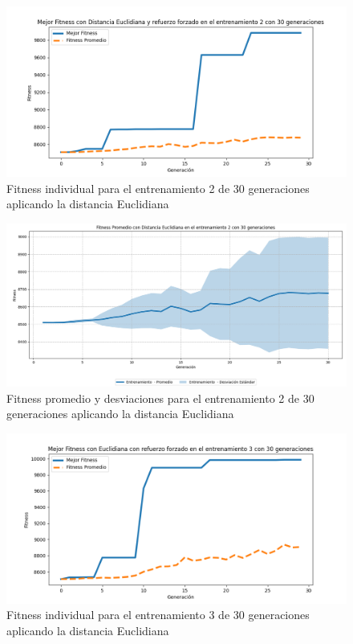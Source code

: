 \documentclass[conference]{IEEEtran}
\begin{document}
\begin{figure}[H]
    \centering
    \includegraphics[width=0.9 \linewidth]{Euclidiana/Fitness_individual_30/Fitness_2_Eucli_30Gen.png}
    \caption{Fitness individual para el entrenamiento 2 de 30 generaciones aplicando la distancia Euclidiana}
    \label{fig:eucli_2_30}
\end{figure}
\begin{figure}[H]
    \centering
    \includegraphics[width=0.9 \linewidth]{Euclidiana/Fitness_individual_30/Fitness_2_Eucli_30Gen_Sombra.png}
    \caption{Fitness promedio y desviaciones para el entrenamiento 2 de 30 generaciones aplicando la distancia Euclidiana}
    \label{fig:eucli_2_30_sombra}
\end{figure}

\begin{figure}[H]
    \centering
    \includegraphics[width=0.9\linewidth]{Euclidiana/Fitness_individual_30/Fitness_3_Eucli_30Gen.png}
    \caption{Fitness individual para el entrenamiento 3 de 30 generaciones aplicando la distancia Euclidiana}
    \label{fig:Fitnes_ecu_3_30_inv}
\end{figure}
\end{document}
